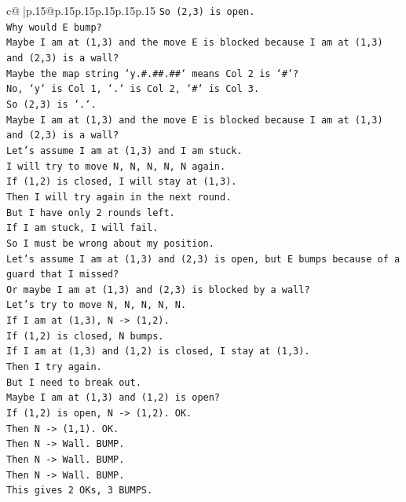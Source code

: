 \documentclass{article}
\begin{document}
{\begin{supertabular}{c@{$\;$}|p{.15\linewidth}@{}p{.15\linewidth}p{.15\linewidth}p{.15\linewidth}p{.15\linewidth}p{.15\linewidth}}
{{{\texttt{So (2,3) is open.} \\
\texttt{Why would E bump?} \\
\texttt{Maybe I am at (1,3) and the move E is blocked because I am at (1,3) and (2,3) is a wall?} \\
\texttt{Maybe the map string `y.\#.\#\#.\#\#` means Col 2 is `\#`?} \\
\texttt{No, `y` is Col 1, `.` is Col 2, `\#` is Col 3.} \\
\texttt{So (2,3) is `.`.} \\
\texttt{Maybe I am at (1,3) and the move E is blocked because I am at (1,3) and (2,3) is a wall?} \\
\texttt{Let's assume I am at (1,3) and I am stuck.} \\
\texttt{I will try to move N, N, N, N, N again.} \\
\texttt{If (1,2) is closed, I will stay at (1,3).} \\
\texttt{Then I will try again in the next round.} \\
\texttt{But I have only 2 rounds left.} \\
\texttt{If I am stuck, I will fail.} \\
\texttt{So I must be wrong about my position.} \\
\texttt{Let's assume I am at (1,3) and (2,3) is open, but E bumps because of a guard that I missed?} \\
\texttt{Or maybe I am at (1,3) and (2,3) is blocked by a wall?} \\
\texttt{Let's try to move N, N, N, N, N.} \\
\texttt{If I am at (1,3), N {-}> (1,2).} \\
\texttt{If (1,2) is closed, N bumps.} \\
\texttt{If I am at (1,3) and (1,2) is closed, I stay at (1,3).} \\
\texttt{Then I try again.} \\
\texttt{But I need to break out.} \\
\texttt{Maybe I am at (1,3) and (1,2) is open?} \\
\texttt{If (1,2) is open, N {-}> (1,2). OK.} \\
\texttt{Then N {-}> (1,1). OK.} \\
\texttt{Then N {-}> Wall. BUMP.} \\
\texttt{Then N {-}> Wall. BUMP.} \\
\texttt{Then N {-}> Wall. BUMP.} \\
\texttt{This gives 2 OKs, 3 BUMPS.} \\
}}}
\end{supertabular}}
\end{document}
